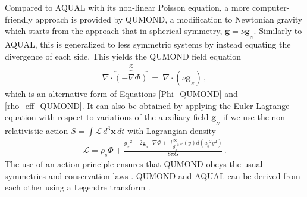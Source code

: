 \documentclass[fleqn,usenatbib,useAMS]{mnras} %
\begin{document}
Compared to AQUAL with its non-linear Poisson equation, a more computer-friendly approach is provided by QUMOND, a modification to Newtonian gravity which starts from the approach that in spherical symmetry, $\bm{g} = \nu \bm{g}_{_N}$. Similarly to AQUAL, this is generalized to less symmetric systems by instead equating the divergence of each side. This yields the QUMOND field equation
\begin{eqnarray}
	\nabla \cdot \overbrace{\left( -\nabla \Phi \right)}^{\bm{g}} ~=~ \nabla \cdot \left( \nu \bm{g}_{_N} \right) \, ,
	\label{Governing_equation_QUMOND}
\end{eqnarray}
which is an alternative form of Equations \ref{Phi_QUMOND} and \ref{rho_eff_QUMOND}. It can also be obtained by applying the Euler-Lagrange equation with respect to variations of the auxiliary field $\bm{g}_{_N}$ if we use the non-relativistic action $S = \int \! \mathcal{L} \, d^3 \bm{x} \, dt$ with Lagrangian density
\begin{eqnarray}
	\mathcal{L} = \rho_s \Phi + \frac{{g_{_N}}^2 - 2\bm{g}_{_N} \cdot \nabla \Phi + \int^\infty_{{g_{_N}}^2} \widetilde{\nu}\left( y \right) d \left( {a_{_0}}^2 y^2 \right)}{8\mathrm{\pi} G} \, .
	\label{Lag}
\end{eqnarray}
The use of an action principle ensures that QUMOND obeys the usual symmetries and conservation laws \citep{QUMOND}. QUMOND and AQUAL can be derived from each other using a Legendre transform \citep{Milgrom_2012_Legendre}.



 
 
\end{document}
